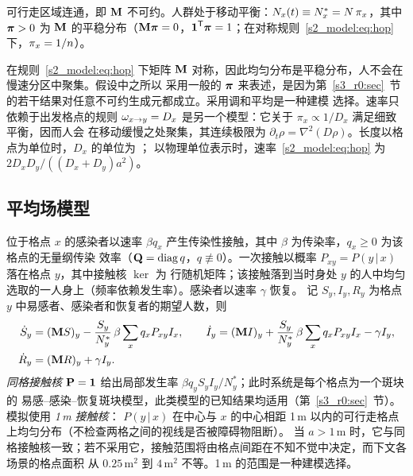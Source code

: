 \begin{assumption}\label{s2_model:ass:A}
  可行走区域连通，即 $\mathbf{M}$ 不可约。人群处于移动平衡：$N_x(t)\equiv N^*_x=N\,\pi_x$，其中 $\boldsymbol{\pi}>0$ 为
  $\mathbf{M}$ 的平稳分布（$\mathbf{M}\boldsymbol{\pi}=0$，$\boldsymbol{1}^{\mathsf{T}}\boldsymbol{\pi}=1$；在对称规则~\eqref{s2_model:eq:hop} 下，$\pi_x=1/n$）。
\end{assumption}

在规则~\eqref{s2_model:eq:hop} 下矩阵 $\mathbf{M}$ 对称，因此均匀分布是平稳分布，人不会在慢速分区中聚集。假设中之所以
采用一般的 $\boldsymbol{\pi}$ 来表述，是因为第~\ref{s3_r0:sec}~节的若干结果对任意不可约生成元都成立。采用调和平均是一种建模
选择。速率只依赖于出发格点的规则 $\omega_{x\to y}=D_x$ 是另一个模型：它关于 $\pi_x\propto1/D_x$ 满足细致平衡，因而人会
在移动缓慢之处聚集，其连续极限为 $\partial_t\rho=\nabla^2(D\rho)$。长度以格点为单位时，$D_x$ 的单位为 \cdunit{}；
以物理单位表示时，速率~\eqref{s2_model:eq:hop} 为 $2D_xD_y/((D_x+D_y)a^2)$。

\subsection{平均场模型}\label{s2_model:sec:meanfield}

位于格点 $x$ 的感染者以速率 $\beta q_x$ 产生传染性接触，其中 $\beta$ 为传染率，$q_x\ge0$ 为该格点的无量纲传染
效率（$\mathbf{Q}=\operatorname{diag} q$，$q\not\equiv0$）。一次接触以概率 $P_{xy}=P(y\,|\,x)$ 落在格点 $y$，其中接触核 $\ker$ 为
行随机矩阵；该接触落到当时身处 $y$ 的人中均匀选取的一人身上（频率依赖发生率）。感染者以速率 $\gamma$ 恢复。
记 $S_y,I_y,R_y$ 为格点 $y$ 中易感者、感染者和恢复者的期望人数，则
\begin{equation}\label{s2_model:eq:meanfield}
\begin{aligned}
  \dot S_y &= (\mathbf{M} S)_y-\frac{S_y}{N^*_y}\,\beta\sum_{x}q_xP_{xy}I_x ,\qquad
  \dot I_y = (\mathbf{M} I)_y+\frac{S_y}{N^*_y}\,\beta\sum_{x}q_xP_{xy}I_x-\gamma I_y ,\\
  \dot R_y &= (\mathbf{M} R)_y+\gamma I_y .
\end{aligned}
\end{equation}
\emph{同格接触核} $\mathbf{P}=\mathbf{1}$ 给出局部发生率 $\beta q_yS_yI_y/N^*_y$；此时系统是每个格点为一个斑块的
易感–感染–恢复斑块模型，此类模型的已知结果均适用（第~\ref{s3_r0:sec}~节）。模拟使用 \emph{1\,m 接触核}：
$P(y\,|\,x)$ 在中心与 $x$ 的中心相距 1\,m 以内的可行走格点上均匀分布（不检查两格之间的视线是否被障碍物阻断）。
当 $a>1$\,m 时，它与同格接触核一致；若不采用它，接触范围将由格点间距在不知不觉中决定，而下文各场景的格点面积
从 $0.25\,\mathrm{m}^2$ 到 $4\,\mathrm{m}^2$ 不等。1\,m 的范围是一种建模选择。

